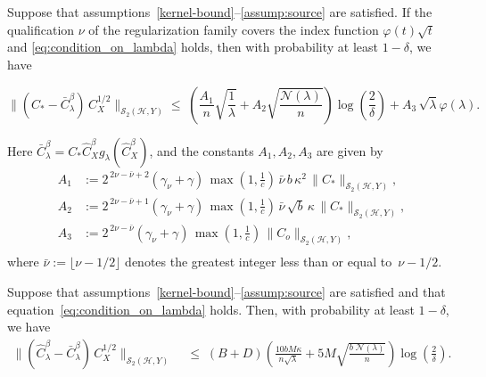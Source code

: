 \documentclass[twoside,11pt]{article}
\begin{document}
\begin{lemma}\label{L_2(lemma-A)}
Suppose that {assumptions~\ref{kernel-bound}--\ref{assump:source}} are satisfied.
If  the qualification $\nu$ of the regularization family covers the index function \(\varphi(t)\sqrt{t}\) and \eqref{eq:condition_on_lambda} holds,
then with probability at least \(1-\delta\), we have

\[\big\|(C_*-\bar{C}_{\lambda}^\beta)\, C_X^{1/2} \big\|_{\mathcal S_2(\mathcal H,Y)} \leq\;
\left(
\frac{A_1}{n}\sqrt{\frac{1}{\lambda}}
+ A_2\sqrt{\frac{\mathcal{N}(\lambda)}{n}}
\right) \log\left(\frac{2}{\delta}\right)
+ A_3\,\sqrt{\lambda}\varphi(\lambda).\]

Here $\bar{C}_{\lambda}^{\beta}
= C_* \widehat{C}_X^{\beta} g_{\lambda}(\widehat{C}_X^{\beta})$,
and the constants $A_1, A_2, A_3$ are given by
\begin{align*}
A_1 &:= 2^{\,2\nu-\bar{\nu}+2}(\gamma_\nu+\gamma)\,
      \max\!\left(1,\frac{1}{c}\right)\,
      \bar{\nu}\, b\, \kappa^2\,
      \| C_{*}\|_{\mathcal S_2(\mathcal H,Y)},\\[4pt]
A_2 &:= 2^{\,2\nu-\bar{\nu}+1}(\gamma_\nu+\gamma)\,
      \max\!\left(1,\frac{1}{c}\right)\,
      \bar{\nu}\,\sqrt{b}\,\kappa\,
      \|C_{*}\|_{\mathcal S_2(\mathcal H,Y)},\\[4pt]
A_3 &:= 2^{\,2\nu-\bar{\nu}}(\gamma_\nu+\gamma)\,
      \max\!\left(1,\frac{1}{c}\right)\,
      \|C_{o}\|_{\mathcal S_2(\mathcal H,Y)},\\[4pt]
\end{align*}
where $\bar{\nu} := \lfloor \nu -1/2 \rfloor$ denotes the greatest integer
less than or equal to~$\nu -1/2$.


    
\end{lemma}

\begin{lemma}\label{L2:bound-B}
Suppose that assumptions~\ref{kernel-bound}--\ref{assump:source} are satisfied and that equation~\eqref{eq:condition_on_lambda} holds. Then, with probability at least \(1-\delta\), we have
\begin{align*}
\bigl\| ( \widehat{C}_\lambda^\beta-\bar{C}_{\lambda}^\beta)\, C_X^{1/2} \bigr\|_{\mathcal S_2(\mathcal H,Y)}
\;&\leq\;
(B+D)\left(
\frac{10bM\kappa}{n\sqrt{\lambda}}
+ 5
M\sqrt{
\frac{b \; \mathcal{N}(\lambda)}{n}
}
\right)\log\!\left( \frac{2}{\delta} \right).
\end{align*}
\end{lemma}
\end{document}
